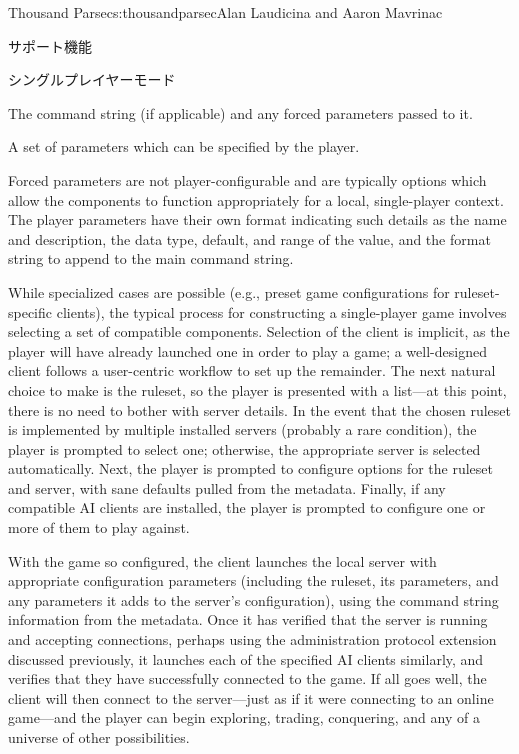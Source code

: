\begin{aosachapter}{Thousand Parsec}{s:thousandparsec}{Alan Laudicina and Aaron Mavrinac}
\begin{aosasect1}{サポート機能}
\begin{aosasect2}{シングルプレイヤーモード}
\begin{aosaitemize}
  \item The command string (if applicable) and any forced parameters
  passed to it.

  \item A set of parameters which can be specified by the player.

\end{aosaitemize}

Forced parameters are not player-configurable and are typically
options which allow the components to function appropriately for a
local, single-player context. The player parameters have their own
format indicating such details as the name and description, the data
type, default, and range of the value, and the format string to append
to the main command string.

While specialized cases are possible (e.g., preset game configurations
for ruleset-specific clients), the typical process for constructing a
single-player game involves selecting a set of compatible
components. Selection of the client is implicit, as the player will
have already launched one in order to play a game; a well-designed
client follows a user-centric workflow to set up the remainder. The
next natural choice to make is the ruleset, so the player is presented
with a list---at this point, there is no need to bother with server
details. In the event that the chosen ruleset is implemented by
multiple installed servers (probably a rare condition), the player is
prompted to select one; otherwise, the appropriate server is selected
automatically. Next, the player is prompted to configure options for
the ruleset and server, with sane defaults pulled from the
metadata. Finally, if any compatible AI clients are installed, the
player is prompted to configure one or more of them to play against.

With the game so configured, the client launches the local server with
appropriate configuration parameters (including the ruleset, its
parameters, and any parameters it adds to the server's configuration),
using the command string information from the metadata. Once it has
verified that the server is running and accepting connections, perhaps
using the administration protocol extension discussed previously, it
launches each of the specified AI clients similarly, and verifies that
they have successfully connected to the game. If all goes well, the
client will then connect to the server---just as if it were connecting
to an online game---and the player can begin exploring, trading,
conquering, and any of a universe of other possibilities.


\end{aosasect2}
\end{aosasect1}
\end{aosachapter}
